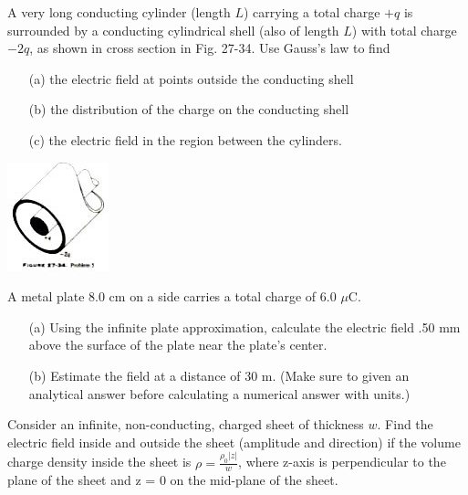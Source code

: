 \documentclass[11pt,letterpaper,boxed]{hmcpset}
\begin{document}
	\begin{problem}[HRK P27.5] 
		A very long conducting cylinder (length $L$) carrying a total charge $+q$ is surrounded by a conducting cylindrical shell (also of length $L$) with total charge $-2q$, as shown in cross section in Fig. 27-34. Use Gauss's law to find 
		\begin{enumerate}
			\item [(a)] the electric field at points outside the conducting shell
			\item [(b)] the distribution of the charge on the conducting shell
			\item [(c)] the electric field in the region between the cylinders.
		\end{enumerate}
		
		
		\begin{center}
				\includegraphics[scale=.7]{fig2734.jpg}
		\end{center}
	\end{problem}
	\begin{solution}
		\vfill
	\end{solution}
	\newpage

	\begin{problem}[HRK E27.29]
		A metal plate 8.0 cm on a side carries a total charge of 6.0 $\mu$C. 
		\begin{enumerate}
			\item [(a)] Using the infinite plate approximation, calculate the electric field .50 mm above the surface of the plate near the plate's center. 
			\item [(b)] Estimate the field at a distance of 30 m. (Make sure to given an analytical answer before calculating a numerical answer with units.)
		\end{enumerate}
		
	\end{problem}
	
	\begin{solution}
		\vfill
	\end{solution}
	\newpage	
	
	\begin{problem}Consider an infinite, non-conducting, charged sheet of thickness $w$. Find the electric field inside and outside the sheet (amplitude and direction) if the volume charge density inside the sheet is $\rho = \frac{\rho_0|z|}{w}$, where z-axis is perpendicular to the plane of the sheet and z = 0 on the mid-plane
of the sheet.
	\end{problem}
	
\end{document}

